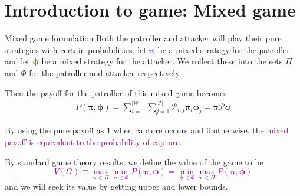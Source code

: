 \documentclass[11pt]{beamer}
\begin{document}
\section[]{Introduction to game: Mixed game}
\hypertarget{Introduction to game: Mixed game}{}
\begin{frame}{Mixed game formulation}
Both the patroller and attacker will play their pure strategies with certain probabilities, let \textcolor{blue}{$\bm{\pi}$} be a mixed strategy for the patroller and let \textcolor{red}{$\bm{\phi}$} be a mixed strategy for the attacker. We collect these into the sets $\Pi$ and $\Phi$ for the patroller and attacker respectively.

\pause

Then the payoff for the patroller of this mixed game becomes
\begin{align*}
P(\bm{\pi} ,\bm{\phi})=\sum\limits_{i=1}^{|\mathcal{W}|} \sum\limits_{j=1}^{|\mathcal{I}|} \mathcal{P}_{i,j} \bm{\pi} _{i} \bm{\phi}_{j}
=\bm{\pi} \mathcal{P} \bm{\phi}
\end{align*}

By using the pure payoff as $1$ when capture occurs and $0$ otherwise, the \textcolor{purple}{mixed payoff is equivalent to the probability of capture}.

\pause

By standard game theory results, we define the value of the game to be
\textcolor{purple}{$$V(G) \equiv \max\limits_{\bm{\pi} \in \Pi} \min\limits_{\bm{\phi} \in \Phi} P(\bm{\pi},\bm{\phi})=\min\limits_{\bm{\phi} \in \Phi} \max\limits_{\bm{\pi} \in \Pi} P(\bm{\pi},\bm{\phi})$$}
and we will seek its value by getting upper and lower bounds.
\end{frame}
\end{document}
